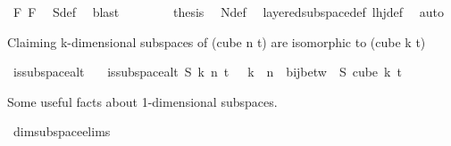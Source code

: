 \begin{isabellebody}
\ F{}\ F{}\ \isamarkupfalse%
\ S{}{\isacharunderscore}{\kern0pt}def\ \isamarkupfalse%
\ blast\isanewline
\ \ \isamarkupfalse%
\isanewline
\ \ \isamarkupfalse%
\ \isamarkupfalse%
\ {\isacharquery}{\kern0pt}thesis\ \isamarkupfalse%
\ N{\isacharunderscore}{\kern0pt}def\ \isamarkupfalse%
\ layered{\isacharunderscore}{\kern0pt}subspace{\isacharunderscore}{\kern0pt}def\ lhj{\isacharunderscore}{\kern0pt}def\ \isamarkupfalse%
\ auto\isanewline
{}\isamarkupfalse%
%
\endisatagproof
{\isafoldproof}%
%
\isadelimproof
%
\endisadelimproof
%
\begin{isamarkuptext}%
Claiming k-dimensional subspaces of (cube n t) are isomorphic to (cube k t)%
\end{isamarkuptext}\isamarkuptrue%
\isamarkupfalse%
\ is{\isacharunderscore}{\kern0pt}subspace{\isacharunderscore}{\kern0pt}alt\isanewline
\ \ \ {\isachardoublequoteopen}is{\isacharunderscore}{\kern0pt}subspace{\isacharunderscore}{\kern0pt}alt\ S\ k\ n\ t\ {\isasymequiv}\ {\isacharparenleft}{\kern0pt}{\isasymexists}{\isasymphi}{\isachardot}{\kern0pt}\ k\ {\isasymle}\ n\ {\isasymand}\ bij{\isacharunderscore}{\kern0pt}betw\ {\isasymphi}\ S\ {\isacharparenleft}{\kern0pt}cube\ k\ t{\isacharparenright}{\kern0pt}{\isacharparenright}{\kern0pt}{\isachardoublequoteclose}%
\begin{isamarkuptext}%
Some useful facts about 1-dimensional subspaces.%
\end{isamarkuptext}\isamarkuptrue%
\isamarkupfalse%
\ dim{}{\isacharunderscore}{\kern0pt}subspace{\isacharunderscore}{\kern0pt}elims{\isacharcolon}{\kern0pt}\ \isanewline

\end{isabellebody}
